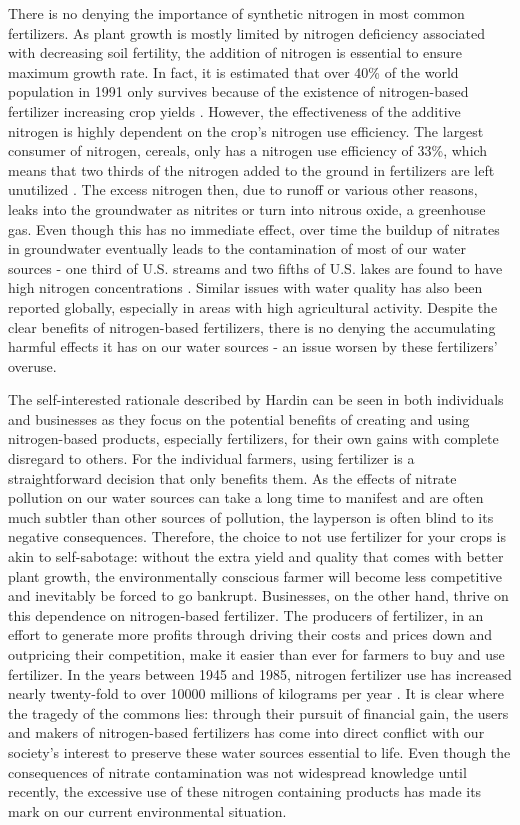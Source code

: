 \documentclass[12pt]{article}
\begin{document}
	There is no denying the importance of synthetic nitrogen in most common fertilizers. As plant growth is mostly limited by nitrogen deficiency associated with decreasing soil fertility, the addition of nitrogen is essential to ensure maximum growth rate. In fact, it is estimated that over 40\% of the world population in 1991 only survives because of the existence of nitrogen-based fertilizer increasing crop yields \cite{soilnitrogen}. However, the effectiveness of the additive nitrogen is highly dependent on the crop’s nitrogen use efficiency. The largest consumer of nitrogen, cereals, only has a nitrogen use efficiency of 33\%, which means that two thirds of the nitrogen added to the ground in fertilizers are left unutilized \cite{ussiri12}. The excess nitrogen then, due to runoff or various other reasons, leaks into the groundwater as nitrites or turn into nitrous oxide, a greenhouse gas. Even though this has no immediate effect, over time the buildup of nitrates in groundwater eventually leads to the contamination of most of our water sources - one third of U.S. streams and two fifths of U.S. lakes are found to have high nitrogen concentrations \cite{issuesinecology}. Similar issues with water quality has also been reported globally, especially in areas with high agricultural activity. Despite the clear benefits of nitrogen-based fertilizers, there is no denying the accumulating harmful effects it has on our water sources - an issue worsen by these fertilizers' overuse.
	
	 The self-interested rationale described by Hardin can be seen in both individuals and businesses as they focus on the potential benefits of creating and using nitrogen-based products, especially fertilizers, for their own gains with complete disregard to others. For the individual farmers, using fertilizer is a straightforward decision that only benefits them. As the effects of nitrate pollution on our water sources can take a long time to manifest and are often much subtler than other sources of pollution, the layperson is often blind to its negative consequences. Therefore, the choice to not use fertilizer for your crops is akin to self-sabotage: without the extra yield and quality that comes with better plant growth, the environmentally conscious farmer will become less competitive and inevitably be forced to go bankrupt. Businesses, on the other hand, thrive on this dependence on nitrogen-based fertilizer. The producers of fertilizer, in an effort to generate more profits through driving their costs and prices down and outpricing their competition, make it easier than ever for farmers to buy and use fertilizer. In the years between 1945 and 1985, nitrogen fertilizer use has increased nearly twenty-fold to over 10000 millions of kilograms per year \cite{usgs}. It is clear where the tragedy of the commons lies: through their pursuit of financial gain, the users and makers of nitrogen-based fertilizers has come into direct conflict with our society's interest to preserve these water sources essential to life. Even though the consequences of nitrate contamination was not widespread knowledge until recently, the excessive use of these nitrogen containing products has made its mark on our current environmental situation.
	 
\end{document}
